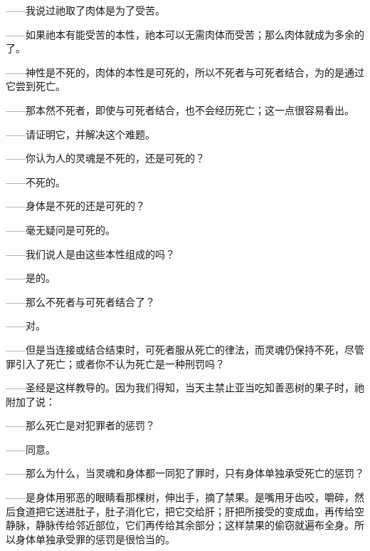 ——我说过祂取了肉体是为了受苦。\par

——如果祂本有能受苦的本性，祂本可以无需肉体而受苦；那么肉体就成为多余的了。\par

——神性是不死的，肉体的本性是可死的，所以不死者与可死者结合，为的是通过它尝到死亡。\par

——那本然不死者，即使与可死者结合，也不会经历死亡；这一点很容易看出。\par

——请证明它，并解决这个难题。\par

——你认为人的灵魂是不死的，还是可死的？\par

——不死的。\par

——身体是不死的还是可死的？\par

——毫无疑问是可死的。\par

——我们说人是由这些本性组成的吗？\par

——是的。\par

——那么不死者与可死者结合了？\par

——对。\par

——但是当连接或结合结束时，可死者服从死亡的律法，而灵魂仍保持不死，尽管罪引入了死亡；或者你不认为死亡是一种刑罚吗？\par

——圣经是这样教导的。因为我们得知，当天主禁止亚当吃知善恶树的果子时，祂附加了说：\par

——那么死亡是对犯罪者的惩罚？\par

——同意。\par

——那么为什么，当灵魂和身体都一同犯了罪时，只有身体单独承受死亡的惩罚？\par

——是身体用邪恶的眼睛看那棵树，伸出手，摘了禁果。是嘴用牙齿咬，嚼碎，然后食道把它送进肚子，肚子消化它，把它交给肝；肝把所接受的变成血，再传给空静脉，静脉传给邻近部位，它们再传给其余部分；这样禁果的偷窃就遍布全身。所以身体单独承受罪的惩罚是很恰当的。\par

